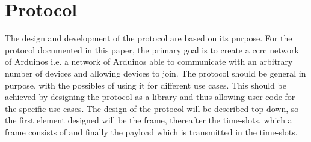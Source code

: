\section{Protocol}
The design and development of the protocol are based on its purpose.
For the protocol documented in this paper, the primary goal is to create a \acrlong{ccrc} network of Arduinos i.e. a network of Arduinos able to communicate with an arbitrary number of devices and allowing devices to join.
The protocol should be general in purpose, with the possibles of using it for different use cases.
This should be achieved by designing the protocol as a library and thus allowing user-code for the specific use cases.
The design of the protocol will be described top-down, so the first element designed will be the frame, thereafter the time-slots, which a frame consists of and finally the payload which is transmitted in the time-slots. 
